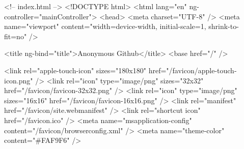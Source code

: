 <!-- index.html -->
<!DOCTYPE html>
<html lang="en" ng-controller="mainController">
  <head>
    <meta charset="UTF-8" />
    <meta
      name="viewport"
      content="width=device-width, initial-scale=1, shrink-to-fit=no"
    />

    <title ng-bind="title">Anonymous Github</title>
    <base href="/" />

    <link
      rel="apple-touch-icon"
      sizes="180x180"
      href="/favicon/apple-touch-icon.png"
    />
    <link
      rel="icon"
      type="image/png"
      sizes="32x32"
      href="/favicon/favicon-32x32.png"
    />
    <link
      rel="icon"
      type="image/png"
      sizes="16x16"
      href="/favicon/favicon-16x16.png"
    />
    <link rel="manifest" href="/favicon/site.webmanifest" />
    <link rel="shortcut icon" href="/favicon.ico" />
    <meta name="msapplication-config" content="/favicon/browserconfig.xml" />
    <meta name="theme-color" content="#FAF9F6" />

    
    
